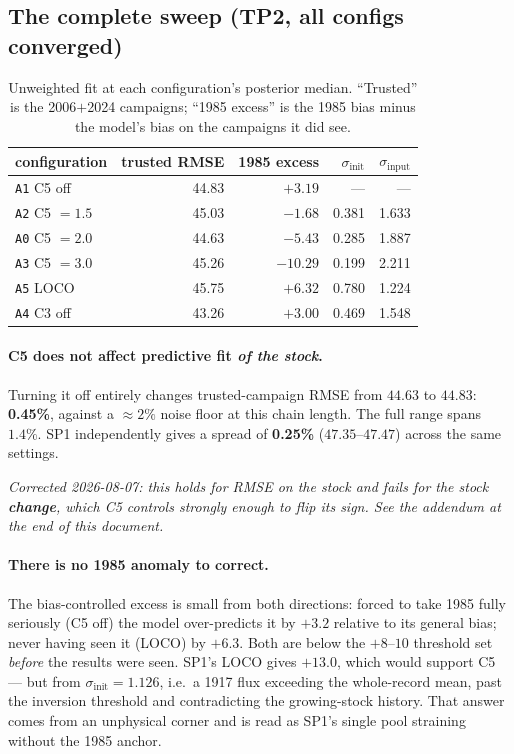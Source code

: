 \documentclass[11pt]{article}
\newcommand{\sinit}{\sigma_{\mathrm{init}}}
\newcommand{\sinput}{\sigma_{\mathrm{input}}}
\begin{document}
\subsection{The complete sweep (TP2, all configs converged)}
\begin{table}[H]\centering\small
\caption{Unweighted fit at each configuration's posterior median. ``Trusted'' is the
2006$+$2024 campaigns; ``1985 excess'' is the 1985 bias minus the model's bias on the campaigns
it did see.}
\begin{tabular}{lrrrr}\toprule
configuration & trusted RMSE & 1985 excess & $\sinit$ & $\sinput$\\\midrule
\texttt{A1} C5 off   & 44.83 & $+3.19$  & --- & ---\\
\texttt{A2} C5 $=1.5$ & 45.03 & $-1.68$  & 0.381 & 1.633\\
\texttt{A0} C5 $=2.0$ & 44.63 & $-5.43$  & 0.285 & 1.887\\
\texttt{A3} C5 $=3.0$ & 45.26 & $-10.29$ & 0.199 & 2.211\\
\texttt{A5} LOCO      & 45.75 & $+6.32$  & 0.780 & 1.224\\
\texttt{A4} C3 off    & 43.26 & $+3.00$  & 0.469 & 1.548\\\bottomrule
\end{tabular}
\end{table}

\paragraph{C5 does not affect predictive fit \emph{of the stock}.} Turning it off entirely
changes trusted-campaign RMSE from $44.63$ to $44.83$: \textbf{0.45\%}, against a $\approx 2\%$
noise floor at this chain length. The full range spans $1.4\%$. SP1 independently gives a spread
of \textbf{0.25\%} ($47.35$--$47.47$) across the same settings.

\emph{Corrected 2026-08-07: this holds for RMSE on the stock and fails for the stock
\textbf{change}, which C5 controls strongly enough to flip its sign. See the addendum at the end
of this document.}

\paragraph{There is no 1985 anomaly to correct.} The bias-controlled excess is small from both
directions: forced to take 1985 fully seriously (C5 off) the model over-predicts it by $+3.2$
relative to its general bias; never having seen it (LOCO) by $+6.3$. Both are below the
$+8$--$10$ threshold set \emph{before} the results were seen. SP1's LOCO gives $+13.0$, which
would support C5 --- but from $\sinit = 1.126$, i.e.\ a 1917 flux exceeding the whole-record
mean, past the inversion threshold and contradicting the growing-stock history. That answer
comes from an unphysical corner and is read as SP1's single pool straining without the 1985
anchor.
\end{document}
